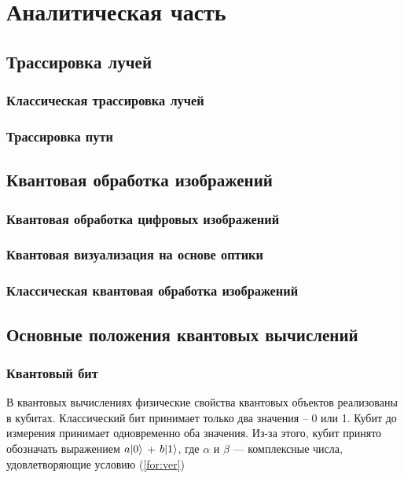 \chapter{Аналитическая часть}

\section{Трассировка лучей}

\subsection{Классическая трассировка лучей}

\subsection{Трассировка пути}

\section{Квантовая обработка изображений}

\subsection{Квантовая обработка цифровых изображений}

\subsection{Квантовая визуализация на основе оптики }

\subsection{Классическая квантовая обработка изображений}

\section{Основные положения квантовых вычислений}

\subsection{Квантовый бит}

В квантовых вычислениях физические свойства квантовых объектов реализованы в кубитах. Классический бит принимает только два значения – 0 или 1. Кубит до измерения принимает одновременно оба значения. Из-за этого, кубит принято обозначать выражением $a\lvert0\rangle$ + $b\lvert1\rangle$, где $\alpha$ и $\beta$ — комплексные числа, удовлетворяющие условию (\ref{for:ver})

